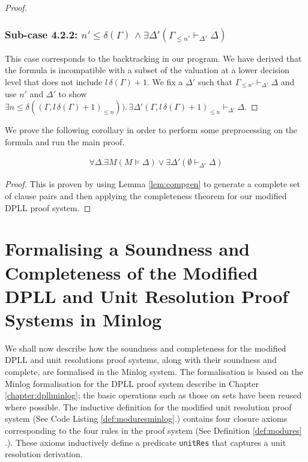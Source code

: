 \begin{mytheorem}
\begin{proof}
\subsubsection*{Sub-case 4.2.2: $ n' \leq \delta(\Gamma) \, \wedge  \exists \Delta' ( \Gamma_{ \leq n'}  \vdash_{\Delta'} \Delta)$} 
This case corresponds to the backtracking in our program. We have derived that the formula is incompatible with a subset of the valuation at a lower decision level that does not include $l \, \delta(\Gamma) + 1$. We fix a $\Delta'$ such that $\Gamma_{\leq n'} \vdash_{\Delta'} \Delta$ and use $n'$ and $\Delta'$ to show $\exists n \leq \delta((\Gamma, l \, \delta(\Gamma) + 1)_{\leq n})). \, \exists \Delta' (\Gamma, l \, \delta(\Gamma) + 1)_{\leq n} \vdash_{\Delta'} \Delta$.
\end{proof}
\end{mytheorem}
%
We prove the following corollary in order to perform some preprocessing on the formula and run the main proof. \\
\medskip
\begin{mycorollary}
\begin{align*}
\forall \Delta. \exists M( M \models \Delta) \vee \exists \Delta'(\emptyset \vdash_{\Delta'} \Delta)
\end{align*}
\begin{proof}
This is proven by using Lemma \ref{lem:compgen} to generate a complete set of clause pairs and then applying the completeness theorem for our modified DPLL proof system.
\end{proof}
\end{mycorollary}

\section{Formalising a Soundness and Completeness of the Modified DPLL and Unit Resolution Proof Systems in Minlog}
We shall now describe how the soundness and completeness for the modified DPLL and  unit resolutions proof systems, along with their soundness and complete, are formalised in the Minlog system. The formalisation is based on the Minlog formalisation for the DPLL proof system describe in Chapter \ref{chapter:dpllminlog}; the basic operations such as those on sets have been reused where possible. The inductive definition for the modified unit resolution proof system (See Code Listing \ref{def:moduresminlog}.) contains four closure axioms corresponding to the four rules in the proof system (See Definition \ref{def:modures} .). These axioms inductively define a predicate \texttt{unitRes} that captures a unit resolution derivation.


